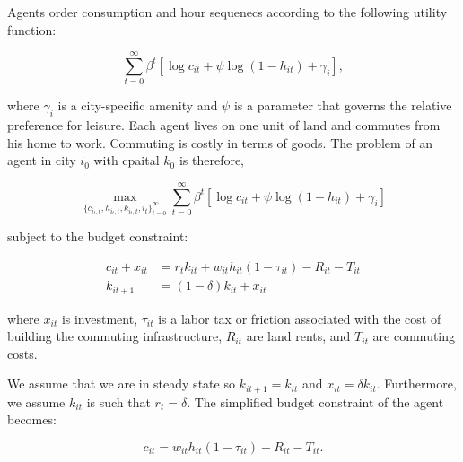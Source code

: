 Agents order consumption and hour sequenecs according to the following utility function:

\begin{equation*}
    \sum_{t=0}^\infty \beta^t \left[ \log c_{it} + \psi \log(1 - h_{it}) + \gamma_i \right],
\end{equation*}

where $\gamma_i$ is a city-specific amenity and $\psi$ is a parameter that governs the relative preference for leisure. Each agent lives on one unit of land and commutes from his home to work. Commuting is costly in terms of goods. The problem of an agent in city $i_0$ with cpaital $k_0$ is therefore,

\begin{equation*}
    \max_{\{c_{i_t, t}, h_{i_t, t}, k_{i_t, t}, i_{t}\}_{t=0}^\infty} \sum_{t=0}^\infty \beta^t \left[ \log c_{it} + \psi \log (1 - h_{it}) + \gamma_i \right]
\end{equation*}

subject to the budget constraint:

\begin{equation*}
    \begin{aligned}
        c_{it} + x_{it} & = r_{t} k_{it} + w_{it} h_{it} (1 - \tau_{it}) - R_{it} - T_{it} \\
        k_{it + 1} & = (1 - \delta) k_{it} + x_{it}
    \end{aligned}
\end{equation*}

where $x_{it}$ is investment, $\tau_{it}$ is a labor tax or friction associated with the cost of building the commuting infrastructure, $R_{it}$ are land rents, and $T_{it}$ are commuting costs.

We assume that we are in steady state so $k_{it + 1} = k_{it}$ and $x_{it} = \delta k_{it}$. Furthermore, we assume $k_{it}$ is such that $r_t = \delta$. The simplified budget constraint of the agent becomes:

\begin{equation}
    c_{it} = w_{it} h_{it} (1 - \tau_{it}) - R_{it} - T_{it}.
\end{equation}